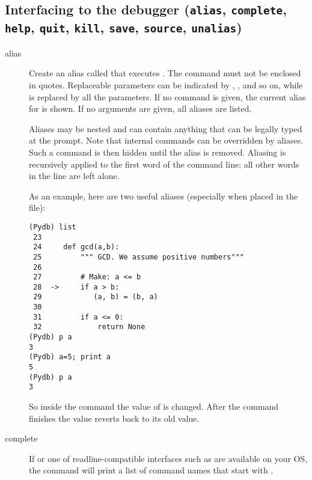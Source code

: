 \subsection{Interfacing to the debugger ({\tt alias}, {\tt complete}, 
{\tt help}, {\tt quit}, {\tt kill}, {\tt save}, {\tt source}, {\tt unalias})\label{subsection-misc}}

\begin{description}

\item[alias ]\label{command:aliases}

Create an alias called  that executes .  The
command must not be enclosed in quotes.  Replaceable parameters
can be indicated by , , and so on, while \samp{\%*} is
replaced by all the parameters.  If no command is given, the current
alias for  is shown. If no arguments are given, all
aliases are listed.

Aliases may be nested and can contain anything that can be legally
typed at the  prompt.  Note that internal 
commands can be overridden by aliases.  Such a command is then hidden
until the alias is removed.  Aliasing is recursively applied to the
first word of the command line; all other words in the line are left
alone.

As an example, here are two useful aliases (especially when placed
in the  file):

\begin{verbatim}
(Pydb) list
 23  	    
 24  	def gcd(a,b):
 25  	    """ GCD. We assume positive numbers"""
 26  	
 27  	    # Make: a <= b
 28  ->	    if a > b:
 29  	       (a, b) = (b, a)
 30  	       
 31  	    if a <= 0:
 32  	        return None
(Pydb) p a
3
(Pydb) a=5; print a
5
(Pydb) p a
3
\end{verbatim}
So inside the command the value of  is changed. After the
command finishes the value reverts back to its old value.

\item[complete ]\label{command:complete}

If
or one of readline-compatible interfaces such as
are available on your OS, the  command will print a
list of command names that start with .


\end{description}
